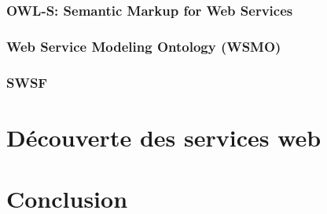 	 \subsubsection{OWL-S: Semantic Markup for Web Services }
	 \subsubsection{Web Service Modeling Ontology (WSMO) }
	 \subsubsection{SWSF}

\section{Découverte des services web}


\section{Conclusion}
